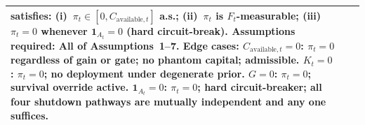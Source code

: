\documentclass[12pt,openany]{book}
\numberwithin{equation}{chapter}
\theoremstyle{plain}
\theoremstyle{definition}
\theoremstyle{remark}
\def\mathcal#1{#1}%
\begin{document}
\begin{table}[H]
\begin{tabularx}{\linewidth}{@{} l l X @{}}
    satisfies: (i)~$\pi_t \in [0, C_{\mathrm{available},t}]$
    a.s.; (ii)~$\pi_t$ is $\mathcal{F}_t$-measurable;
    (iii)~$\pi_t = 0$ whenever $\mathbf{1}_{\mathcal{A}_t} = 0$
    (hard circuit-break).
    \newline
    \textbf{Assumptions required:} All of Assumptions~1--7.
    \newline
    \textbf{Edge cases:} $C_{\mathrm{available},t} = 0$: $\pi_t = 0$
    regardless of gain or gate; no phantom capital; admissible.
    $K_t = 0$: $\pi_t = 0$; no deployment under degenerate prior.
    $G = 0$: $\pi_t = 0$; survival override active.
    $\mathbf{1}_{\mathcal{A}_t} = 0$: $\pi_t = 0$; hard
    circuit-breaker; all four shutdown pathways are mutually
    independent and any one suffices. \\
\bottomrule
\end{tabularx}
\end{table}
\end{document}
